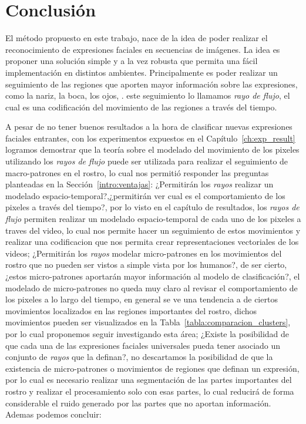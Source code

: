 \chapter[Conclusión]{Conclusión}
\label{ch:conclusion}

El método propuesto en este trabajo, nace de la idea de poder realizar el reconocimiento de expresiones faciales en secuencias de imágenes. La idea es proponer una solución simple y a la vez robusta que permita una fácil implementación en distintos ambientes. Principalmente es poder realizar un seguimiento de las regiones que aporten mayor información sobre las expresiones, como la nariz, la boca, los ojos, \etc. este seguimiento lo llamamos \textit{rayo de flujo}, el cual es una codificación del movimiento de las regiones a través del tiempo.

A pesar de no tener buenos resultados a la hora de clasificar nuevas expresiones faciales entrantes, con los experimentos expuestos en el Capítulo~\ref{ch:exp_result} logramos demostrar que la teoría sobre el modelado del movimiento de los pixeles utilizando los \textit{rayos de flujo} puede ser utilizada para realizar el seguimiento de macro-patrones en el rostro, lo cual nos permitió responder las preguntas planteadas en la Sección~\ref{intro:ventajas}: ¿Permitirán los \textit{rayos} realizar un modelado espacio-temporal?,¿permitirán ver cual es el comportamiento de los pixeles a través del tiempo?, por lo visto en el capítulo de resultados, los \textit{rayos de flujo} permiten realizar un modelado espacio-temporal de cada uno de los pixeles a traves del video, lo cual nos permite hacer un seguimiento de estos movimientos y realizar una codificacion que nos permita crear representaciones vectoriales de los videos;  ¿Permitirán los \textit{rayos} modelar micro-patrones en los movimientos del rostro que no pueden ser vistos a simple vista por los humanos?, de ser cierto, ¿estos micro-patrones aportarán mayor información al modelo de clasificación?, el modelado de micro-patrones no queda muy claro al revisar el comportamiento de los pixeles a lo largo del tiempo, en general se ve una tendencia a de ciertos movimientos localizados en las regiones importantes del rostro, dichos movimientos pueden ser visualizados en la Tabla~\ref{tabla:comparacion_clusters}, por lo cual proponemos seguir investigando esta área; ¿Existe la posibilidad de que cada una de las expresiones faciales universales pueda tener asociado un conjunto de \textit{rayos} que la definan?, no descartamos la posibilidad de que la existencia de micro-patrones o movimientos de regiones que definan un expresión, por lo cual es necesario realizar una segmentación de las partes importantes del rostro y realizar el procesamiento solo con esas partes, lo cual reducirá de forma considerable el ruido generado por las partes que no aportan información. Ademas podemos concluir:

